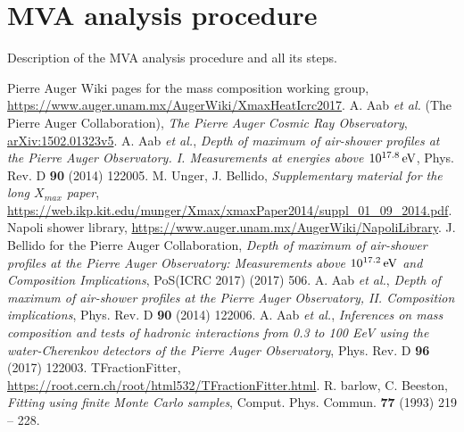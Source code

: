 \documentclass[12pt,a4paper]{report}
\begin{document}
\chapter{MVA analysis procedure}
Description of the MVA analysis procedure and all its steps.

\pagebreak
\titleformat{\chapter}[hang]{\normalfont\bf}{}{12pt}{\Large}
\begin{thebibliography}{50} 
\raggedright
{} Pierre Auger Wiki pages for the mass composition working group, \href{https://www.auger.unam.mx/AugerWiki/XmaxHeatIcrc2017}{https://www.auger.unam.mx/AugerWiki/XmaxHeatIcrc2017}.
 A. Aab \emph{et al.} (The Pierre Auger Collaboration), \emph{The Pierre Auger Cosmic Ray Observatory}, \href{http://arxiv.org/pdf/1502.01323.pdf}{arXiv:1502.01323v5}.
 A. Aab \emph{et al.}, \emph{Depth of maximum of air-shower profiles at the Pierre Auger Observatory. I. Measurements at energies above $\unit[10^{17.8}]{eV}$}, Phys. Rev. D \textbf{90} (2014) 122005.
 M. Unger, J. Bellido, \emph{Supplementary material for the long $X_{max}$ paper}, \href{https://web.ikp.kit.edu/munger/Xmax/xmaxPaper2014/suppl\_01\_09\_2014.pdf}{https://web.ikp.kit.edu/munger/Xmax/xmaxPaper2014/suppl\_01\_09\_2014.pdf}.
 Napoli shower library, \href{https://www.auger.unam.mx/AugerWiki/NapoliLibrary}{https://www.auger.unam.mx/AugerWiki/NapoliLibrary}.
 J. Bellido for the Pierre Auger Collaboration, \emph{Depth of maximum of air-shower profiles at the Pierre Auger Observatory: Measurements above $\unit[10^{17.2}]{eV}$ and Composition Implications}, PoS(ICRC 2017) (2017) 506.
 A. Aab \emph{et al.}, \emph{Depth of maximum of air-shower profiles at the Pierre Auger Observatory, II. Composition implications}, Phys. Rev. D \textbf{90} (2014) 122006.
 A. Aab \emph{et al.}, \emph{Inferences on mass composition and tests of hadronic interactions from 0.3 to 100 EeV using the water-Cherenkov detectors of the Pierre Auger Observatory}, Phys. Rev. D \textbf{96} (2017) 122003.
 TFractionFitter, \href{https://root.cern.ch/root/html532/TFractionFitter.html}{https://root.cern.ch/root/html532/TFractionFitter.html}.
 R. barlow, C. Beeston, \emph{Fitting using finite Monte Carlo samples}, Comput. Phys. Commun. \textbf{77} (1993) 219 -- 228.

\end{thebibliography}
\end{document}
